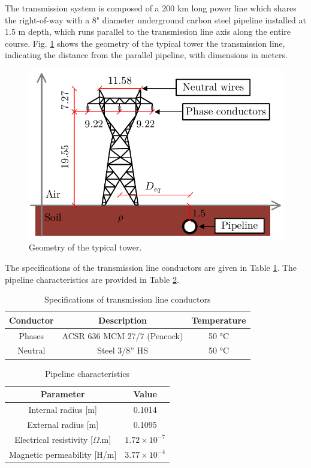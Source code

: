 \documentclass[conference]{IEEEtran}
\begin{document}
The transmission system is composed of a 200 km long power line which shares the right-of-way with a 8" diameter underground carbon steel pipeline installed at 1.5 m depth, which runs parallel to the transmission line axis along the entire course. Fig.  \ref{fig:SistTesteCorte} shows the geometry of the typical tower the transmission line, indicating the distance from the parallel pipeline, with dimensions in meters.

\begin{figure}[hbt]
	\begin{center}
		\includegraphics[width=.8\columnwidth]{fig/SistTesteCorte.pdf}
		\caption{Geometry of the typical tower.}
		\label{fig:SistTesteCorte}
	\end{center}
\end{figure}

The specifications of the transmission line conductors  are given in Table \ref{table:LTCond}. The pipeline characteristics are provided in Table \ref{table:PipeParam}.

\begin{table}[!hbt]
	\renewcommand{\arraystretch}{1.3}
	\caption{Specifications of transmission line conductors}
	\label{table:LTCond}
	\centering
	\begin{tabular}{|c|c|c|}
		\hline
		\textbf{Conductor} & \textbf{Description} & \textbf{Temperature} \\
		\hline
		Phases & ACSR 636 MCM 27/7 (Peacock) & 50 °C\\
		\hline
		Neutral & Steel 3/8” HS & 50 °C\\
		\hline
	\end{tabular}
\end{table}

\begin{table}[!hbt]
	\renewcommand{\arraystretch}{1.3}
	\caption{Pipeline characteristics}
	\label{table:PipeParam}
	\centering
	\begin{tabular}{|c|c|}
		\hline
		\textbf{Parameter} & \textbf{Value} \\
		\hline
		Internal radius [m] & 0.1014\\
		\hline
		External radius [m] & 0.1095\\
		\hline
		Electrical resistivity [$\Omega$.m] & $1.72\times10^{-7}$\\
		\hline
		Magnetic permeability [H/m] & $3.77\times10^{-4}$\\
		\hline
	\end{tabular}
\end{table}
\end{document}
